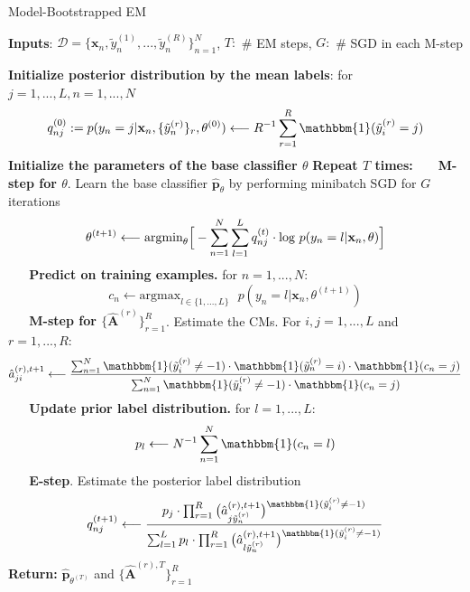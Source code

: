 \begin{algorithm}
	\caption{Model-Bootstrapped EM \cite{khetan2017learning}}
	\label{alg:generalised_em}
	\small
	\begin{algorithmic}
		\State \textbf{Inputs}: $\mathcal{D} = \{\textbf{x}_n, \tilde{y}^{(1)}_{n},...,\tilde{y}^{(R)}_{n}\}_{n=1}^{N}$,
		$T:$ \# EM steps, $G:$ \# SGD in each M-step
		
		\State \textbf{Initialize posterior distribution by the mean labels}: for $j=1,..., L, n=1,...,N$
		\vspace{-2mm}
		$$q_{nj} ^{(0)}: = p(y_{n}=j|\textbf{x}_{n}, \{\tilde{y}^{(r)}_{n}\}_r, \theta^{(0)}) \longleftarrow R^{-1}\sum_{r=1}^R \mathbbm{1}(\tilde{y}_{i}^{(r)}=j) $$
		\vspace{-3mm}
		\State \textbf{Initialize the parameters of the base classifier $\theta$}
		\State \textbf{Repeat $T$ times:}
		\State $\,\,\,\,\,\,\,\,$ \textbf{M-step for $\theta$}. Learn the base classifier  $\hat{\mathbf{p}}_{\theta}$ by performing minibatch SGD for $G$ iterations 
		\vspace{-2mm}
		$$\theta^{(t+1)} \longleftarrow \text{argmin}_{\theta}\Big{[}-\sum_{n=1}^{N}\sum_{l=1}^{L}q_{nj} ^{(t)}\cdot \text{log } p(y_{n}=l|\mathbf{x}_{n}, \theta)\Big{]}$$ 
		\vspace{-3mm}
		\State $\,\,\,\,\,\,\,\,$ \textbf{Predict on training examples.} for $n=1,...,N$:
		\vspace{-2mm}
		$$c_{n} \longleftarrow \text{argmax}_{l\in\{1,...,L\}}\text{ }p(y_{n}=l|\mathbf{x}_{n}, \theta^{(t+1)}) $$
		\vspace{-3mm}
		\State $\,\,\,\,\,\,\,\,$ \textbf{M-step for $\{\hat{\mathbf{A}}^{(r)}\}_{r=1}^{R}$}. Estimate the CMs. For $i,j=1,...,L$ and $r=1,...,R$:
		\vspace{-2mm}
		$$\hat{a}_{ji}^{(r),t+1} \longleftarrow \frac{\sum_{n=1}^{N}\mathbbm{1}(\tilde{y}_{i}^{(r)} \neq -1)\cdot \mathbbm{1}(\tilde{y}^{(r)}_{n}=i)\cdot \mathbbm{1}(c_{n}=j)}{\sum_{n=1}^{N} \mathbbm{1}(\tilde{y}_{i}^{(r)} \neq -1)\cdot \mathbbm{1}(c_{n}=j)}$$ 
		\vspace{-3mm}
		\State $\,\,\,\,\,\,\,\,$ \textbf{Update prior label distribution.} for $l=1,...,L$:
		\vspace{-3mm}
		$$p_{l} \longleftarrow N^{-1}\sum_{n=1}^N \mathbbm{1}(c_{n}=l) $$
		\vspace{-3mm}
		\State $\,\,\,\,\,\,\,\,$  \textbf{E-step}. Estimate the posterior label distribution
		\vspace{-2mm}
		$$q_{nj} ^{(t+1)} \longleftarrow \frac{p_{j}\cdot\prod_{r=1}^{R}\big{(}\hat{a}^{(r),t+1}_{j\tilde{y}^{(r)}_{n}}\big{)}^{\mathbbm{1}(\tilde{y}_{i}^{(r)} \neq -1)}}{\sum_{l=1}^L p_{l}\cdot\prod_{r=1}^{R}\big{(}\hat{a}^{(r),t+1}_{l\tilde{y}^{(r)}_{n}}\big{)}^{\mathbbm{1}(\tilde{y}_{i}^{(r)} \neq -1)}}$$
		\vspace{-3mm}
		\State \textbf{Return:   } $\hat{\mathbf{p}}_{\theta^{(T)}}$ and $\{\hat{\mathbf{A}}^{(r),T}\}_{r=1}^R$
	\end{algorithmic}
\end{algorithm}




